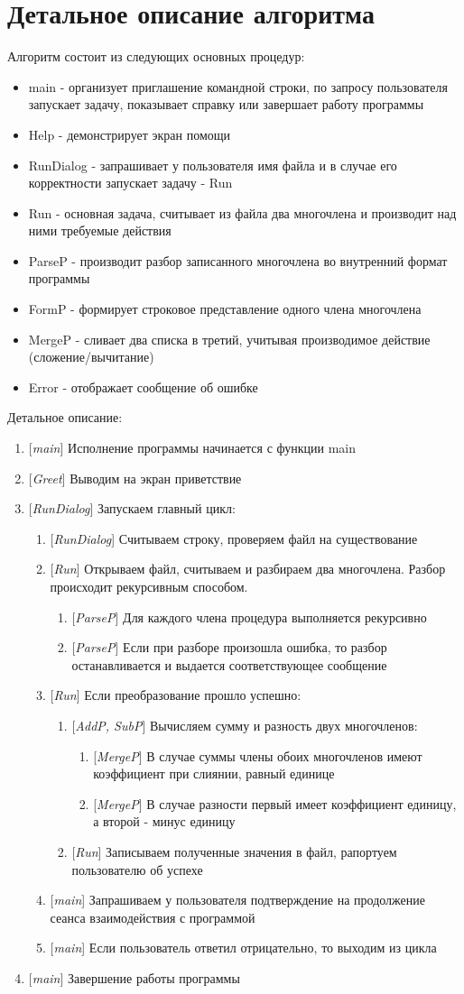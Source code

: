 \section{Детальное описание алгоритма}
\DeclareRobustCommand{\l}[1]{
\item {[}{\it #1}{]} 
}
Алгоритм состоит из следующих основных процедур:
\begin{itemize}
\item main - организует приглашение командной строки, по запросу пользователя
запускает задачу, показывает справку или завершает работу программы
\item Help - демонстрирует экран помощи
\item RunDialog - запрашивает у пользователя имя файла и в случае его
корректности запускает задачу - Run
\item Run - основная задача, считывает из файла два многочлена и производит
над ними требуемые действия
\item ParseP - производит разбор записанного многочлена во внутренний формат
программы
\item FormP - формирует строковое представление одного члена многочлена
\item MergeP - сливает два списка в третий, учитывая производимое действие
(сложение/вычитание)
\item Error - отображает сообщение об ошибке
\end{itemize}

Детальное описание:
\begin{enumerate}
  \l{main} Исполнение программы начинается с функции main
  \l{Greet} Выводим на экран приветствие
  \l{RunDialog} Запускаем главный цикл:
  \begin{enumerate}
    \l{RunDialog} Считываем строку, проверяем файл на существование
    \l{Run} Открываем файл, считываем и разбираем два многочлена. Разбор
    происходит рекурсивным способом.
    \begin{enumerate}
      \l{ParseP} Для каждого члена процедура выполняется рекурсивно
      \l{ParseP} Если при разборе произошла ошибка, то разбор останавливается
      и выдается соответствующее сообщение
    \end{enumerate}
    \l{Run} Если преобразование прошло успешно:
    \begin{enumerate}
      \l{AddP, SubP} Вычисляем сумму и разность двух многочленов:
      \begin{enumerate}
        \l{MergeP} В случае суммы члены обоих многочленов имеют коэффициент
        при слиянии, равный единице 
        \l{MergeP} В случае разности первый имеет коэффициент единицу, а
        второй - минус единицу
      \end{enumerate}
      \l{Run} Записываем полученные значения в файл, рапортуем пользователю об
      успехе
    \end{enumerate}
    \l{main} Запрашиваем у пользователя подтверждение на продолжение
    сеанса взаимодействия с программой
    \l{main} Если пользователь ответил отрицательно, то выходим из
    цикла
  \end{enumerate}
  \l{main} Завершение работы программы
\end{enumerate}

\pagebreak

